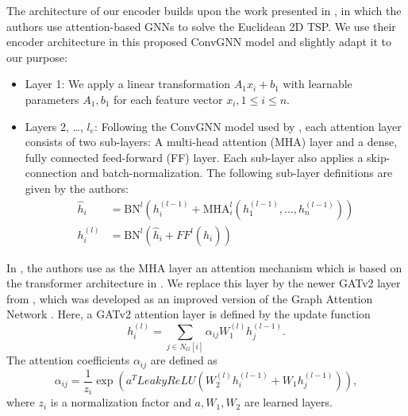 \documentclass[draft,final]{vutinfth} %
\begin{document}


The architecture of our encoder builds upon the work presented in \cite{Kool2019}, in which the authors use attention-based GNNs to solve the Euclidean 2D TSP. We use their encoder architecture in this proposed ConvGNN model and slightly adapt it to our purpose:
\begin{itemize}
    \item Layer 1: We apply a linear transformation $A_1 x_i + b_1$ with learnable parameters $A_1, b_1$ for each feature vector $x_i, 1 \leq i \leq n$.
    \item Layers 2, \dots, $l_e$: Following the ConvGNN model used by \cite{Kool2019}, each attention layer consists of two sub-layers: A multi-head attention (MHA) layer and a dense, fully connected feed-forward (FF) layer. Each sub-layer also applies a skip-connection and batch-normalization. The following sub-layer definitions are given by the authors: 
    \begin{align*}
        \hat{h}_i &= \text{BN}^l(h_i^{(l-1)} + \text{MHA}_i^l (h_1^{(l-1)}, \dots , h_n^{(l-1)}) ) \\
        h_i^{(l)} &= \text{BN}^l(\hat{h}_i + FF^l(\hat{h}_i))
    \end{align*}
\end{itemize}
In \cite{Kool2019}, the authors use as the MHA layer an attention mechanism which is based on the transformer architecture in \cite{VaswaniSPUJGKP17}. We replace this layer by the newer GATv2 layer from \cite{Brody2021}, which was developed as an improved version of the Graph Attention Network \cite{Velickovic2018}. Here, a GATv2 attention layer is defined by the update function 
\[
    h_i^{(l)} = \sum_{j \in N_G[i]} \alpha_{ij} W_{1}^{(l)} h_j^{(l-1)}.    
\]
The attention coefficients $\alpha_{ij}$ are defined as 
\[
    \alpha_{ij} = \frac{1}{z_i} \exp(a^T \mathit{LeakyReLU(W_2^{(l)}h_i^{(l-1)} + W_1 h_j^{(l-1)} )}),    
\]
where $z_i$ is a normalization factor and $a, W_1, W_2$ are learned layers. 
\end{document}
